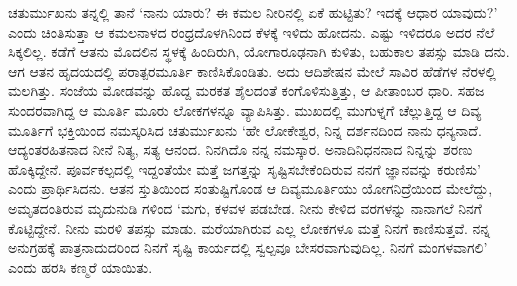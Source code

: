 ಚತುರ್ಮುಖನು ತನ್ನಲ್ಲಿ ತಾನೆ ‘ನಾನು ಯಾರು? ಈ ಕಮಲ ನೀರಿನಲ್ಲಿ ಏಕೆ ಹುಟ್ಟಿತು? ಇದಕ್ಕೆ ಆಧಾರ ಯಾವುದು?’ ಎಂದು ಚಿಂತಿಸುತ್ತಾ ಆ ಕಮಲನಾಳದ ರಂಧ್ರದೊಳಗಿನಿಂದ ಕೆಳಕ್ಕೆ ಇಳಿದು ಹೋದನು. ಎಷ್ಟು ಇಳಿದರೂ ಅದರ ನೆಲೆ ಸಿಕ್ಕಲಿಲ್ಲ. ಕಡೆಗೆ ಆತನು ಮೊದಲಿನ ಸ್ಥಳಕ್ಕೆ ಹಿಂದಿರುಗಿ, ಯೋಗಾರೂಢನಾಗಿ ಕುಳಿತು, ಬಹುಕಾಲ ತಪಸ್ಸು ಮಾಡಿ ದನು. ಆಗ ಆತನ ಹೃದಯದಲ್ಲಿ ಪರಾತ್ಪರಮೂರ್ತಿ ಕಾಣಿಸಿಕೊಂಡಿತು. ಅದು ಆದಿಶೇಷನ ಮೇಲೆ ಸಾವಿರ ಹೆಡೆಗಳ ನೆರಳಲ್ಲಿ ಮಲಗಿತ್ತು. ಸಂಜೆಯ ಮೋಡವನ್ನು ಹೊದ್ದ ಮರಕತ ಶೈಲದಂತೆ ಕಂಗೊಳಿಸುತ್ತಿತ್ತು, ಆ ಪೀತಾಂಬರ ಧಾರಿ. ಸಹಜ ಸುಂದರವಾಗಿದ್ದ ಆ ಮೂರ್ತಿ ಮೂರು ಲೋಕಗಳನ್ನೂ ವ್ಯಾಪಿಸಿತ್ತು. ಮುಖದಲ್ಲಿ ಮುಗುಳ್ನಗೆ ಚೆಲ್ಲುತ್ತಿದ್ದ ಆ ದಿವ್ಯ ಮೂರ್ತಿಗೆ ಭಕ್ತಿಯಿಂದ ನಮಸ್ಕರಿಸಿದ ಚತುರ್ಮುಖನು ‘ಹೇ ಲೋಕೇಶ್ವರ, ನಿನ್ನ ದರ್ಶನದಿಂದ ನಾನು ಧನ್ಯನಾದೆ. ಆದ್ಯಂತರಹಿತನಾದ ನೀನೆ ನಿತ್ಯ, ಸತ್ಯ ಆನಂದ. ನಿನಗಿದೊ ನನ್ನ ನಮಸ್ಕಾರ. ಅನಾದಿನಿಧನನಾದ ನಿನ್ನನ್ನು ಶರಣು ಹೊಕ್ಕಿದ್ದೇನೆ. ಪೂರ್ವಕಲ್ಪದಲ್ಲಿ ಇದ್ದಂತೆಯೇ ಮತ್ತೆ ಜಗತ್ತನ್ನು ಸೃಷ್ಟಿಸಬೇಕೆಂದಿರುವ ನನಗೆ ಜ್ಞಾನವನ್ನು ಕರುಣಿಸು’ ಎಂದು ಪ್ರಾರ್ಥಿಸಿದನು. ಆತನ ಸ್ತುತಿಯಿಂದ ಸಂತುಷ್ಟಿಗೊಂಡ ಆ ದಿವ್ಯಮೂರ್ತಿಯು ಯೋಗನಿದ್ರೆಯಿಂದ ಮೇಲೆದ್ದು, ಅಮೃತದಂತಿರುವ ಮೃದುನುಡಿ ಗಳಿಂದ ‘ಮಗು, ಕಳವಳ ಪಡಬೇಡ. ನೀನು ಕೇಳಿದ ವರಗಳನ್ನು ನಾನಾಗಲೆ ನಿನಗೆ ಕೊಟ್ಟಿದ್ದೇನೆ. ನೀನು ಮರಳಿ ತಪಸ್ಸು ಮಾಡು. ಮರೆಯಾಗಿರುವ ಎಲ್ಲ ಲೋಕಗಳೂ ಮತ್ತೆ ನಿನಗೆ ಕಾಣಿಸುತ್ತವೆ. ನನ್ನ ಅನುಗ್ರಹಕ್ಕೆ ಪಾತ್ರನಾದುದರಿಂದ ನಿನಗೆ ಸೃಷ್ಟಿ ಕಾರ್ಯದಲ್ಲಿ ಸ್ವಲ್ಪವೂ ಬೇಸರವಾಗುವುದಿಲ್ಲ. ನಿನಗೆ ಮಂಗಳವಾಗಲಿ’ ಎಂದು ಹರಸಿ ಕಣ್ಮರೆ ಯಾಯಿತು.

